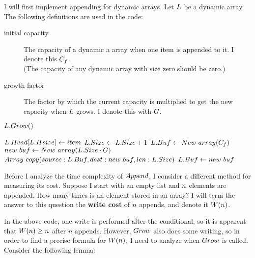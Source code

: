 \HdrDynArrayImpl

I will first implement appending for dynamic arrays. Let $L$ be a dynamic array. The following definitions are used in the code:

\begin{description}
	\item[initial capacity] The capacity of a dynamic a array when one item is appended to it. I denote this $C_f$.\\
	(The capacity of any dynamic array with size zero should be zero.)
	\item[growth factor] The factor by which the current capacity is multiplied to get the new capacity when $L$ grows. I denote this with $G$.
\end{description}

\begin{algorithm}
	\begin{algorithmic}[1]
				\State $L.Grow()$
			\EndIf
			
			\State $L.Head[L.Hsize] \gets item$
			\State $L.Size \gets L.Size + 1$
		\EndProcedure
		\Statex
				\State $L.Buf \gets New\ array(C_f)$
			\Else
				\State $new\ buf \gets New\ array(L.Size \cdot G)$
				\State $Array\ copy(source: L.Buf, dest: new\ buf, len: L.Size)$
				\State $L.Buf \gets new\ buf$
			\EndIf
		\EndProcedure
	\end{algorithmic}
\end{algorithm}

\HdrTimeComplex

Before I analyze the time complexity of $Append$, I consider a different method for measuring its cost. Suppose I start with an empty list and $n$ elements are appended. How many times is an element stored in an array? I will term the answer to this question the \textbf{write cost} of $n$ appends, and denote it $W(n)$.

In the above code, one write is performed after the conditional, so it is apparent that $W(n) \geq n$ after $n$ appends. However, $Grow$ also does some writing, so in order to find a precise formula for $W(n)$, I need to analyze when $Grow$ is called. Consider the following lemma:

